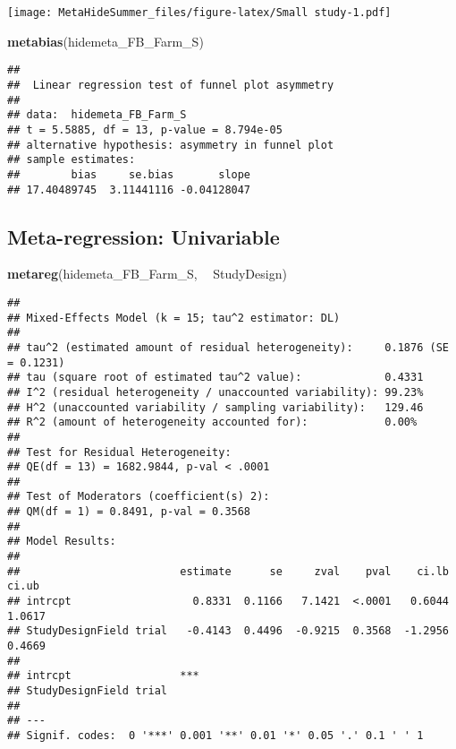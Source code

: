 \documentclass[]{article}
\newenvironment{Shaded}{\begin{snugshade}}{\end{snugshade}}
\newcommand{\KeywordTok}[1]{\textcolor[rgb]{0.13,0.29,0.53}{\textbf{#1}}}
\newcommand{\StringTok}[1]{\textcolor[rgb]{0.31,0.60,0.02}{#1}}
\newcommand{\OperatorTok}[1]{\textcolor[rgb]{0.81,0.36,0.00}{\textbf{#1}}}
\newcommand{\NormalTok}[1]{#1}
\begin{document}
\texttt{[image: MetaHideSummer\_files/figure-latex/Small study-1.pdf]}

\begin{Shaded}
\begin{Highlighting}[]
\KeywordTok{metabias}\NormalTok{(hidemeta_FB_Farm_S)}
\end{Highlighting}
\end{Shaded}

\begin{verbatim}
## 
##  Linear regression test of funnel plot asymmetry
## 
## data:  hidemeta_FB_Farm_S
## t = 5.5885, df = 13, p-value = 8.794e-05
## alternative hypothesis: asymmetry in funnel plot
## sample estimates:
##        bias     se.bias       slope 
## 17.40489745  3.11441116 -0.04128047
\end{verbatim}

\subsection{Meta-regression:
Univariable}\label{meta-regression-univariable}

\begin{Shaded}
\begin{Highlighting}[]
\KeywordTok{metareg}\NormalTok{(hidemeta_FB_Farm_S, }\OperatorTok{~}\StringTok{ }\NormalTok{StudyDesign)}
\end{Highlighting}
\end{Shaded}

\begin{verbatim}
## 
## Mixed-Effects Model (k = 15; tau^2 estimator: DL)
## 
## tau^2 (estimated amount of residual heterogeneity):     0.1876 (SE = 0.1231)
## tau (square root of estimated tau^2 value):             0.4331
## I^2 (residual heterogeneity / unaccounted variability): 99.23%
## H^2 (unaccounted variability / sampling variability):   129.46
## R^2 (amount of heterogeneity accounted for):            0.00%
## 
## Test for Residual Heterogeneity: 
## QE(df = 13) = 1682.9844, p-val < .0001
## 
## Test of Moderators (coefficient(s) 2): 
## QM(df = 1) = 0.8491, p-val = 0.3568
## 
## Model Results:
## 
##                         estimate      se     zval    pval    ci.lb   ci.ub
## intrcpt                   0.8331  0.1166   7.1421  <.0001   0.6044  1.0617
## StudyDesignField trial   -0.4143  0.4496  -0.9215  0.3568  -1.2956  0.4669
##                            
## intrcpt                 ***
## StudyDesignField trial     
## 
## ---
## Signif. codes:  0 '***' 0.001 '**' 0.01 '*' 0.05 '.' 0.1 ' ' 1
\end{verbatim}
\end{document}
